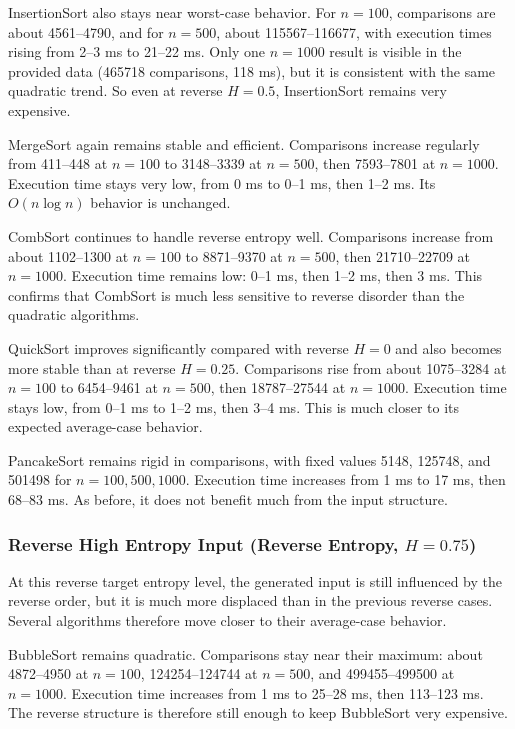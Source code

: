 \documentclass{article}
\begin{document}
InsertionSort also stays near worst-case behavior. For $n=100$, comparisons are about 4561--4790, and for $n=500$, about 115567--116677, with execution times rising from 2--3 ms to 21--22 ms. Only one $n=1000$ result is visible in the provided data (465718 comparisons, 118 ms), but it is consistent with the same quadratic trend. So even at reverse $H=0.5$, InsertionSort remains very expensive.

MergeSort again remains stable and efficient. Comparisons increase regularly from 411--448 at $n=100$ to 3148--3339 at $n=500$, then 7593--7801 at $n=1000$. Execution time stays very low, from 0 ms to 0--1 ms, then 1--2 ms. Its $O(n \log n)$ behavior is unchanged.

CombSort continues to handle reverse entropy well. Comparisons increase from about 1102--1300 at $n=100$ to 8871--9370 at $n=500$, then 21710--22709 at $n=1000$. Execution time remains low: 0--1 ms, then 1--2 ms, then 3 ms. This confirms that CombSort is much less sensitive to reverse disorder than the quadratic algorithms.

QuickSort improves significantly compared with reverse $H=0$ and also becomes more stable than at reverse $H=0.25$. Comparisons rise from about 1075--3284 at $n=100$ to 6454--9461 at $n=500$, then 18787--27544 at $n=1000$. Execution time stays low, from 0--1 ms to 1--2 ms, then 3--4 ms. This is much closer to its expected average-case behavior.

PancakeSort remains rigid in comparisons, with fixed values 5148, 125748, and 501498 for $n=100,500,1000$. Execution time increases from 1 ms to 17 ms, then 68--83 ms. As before, it does not benefit much from the input structure.


\subsubsection{Reverse High Entropy Input (Reverse Entropy, $H = 0.75$)}

At this reverse target entropy level, the generated input is still influenced by the reverse order, but it is much more displaced than in the previous reverse cases. Several algorithms therefore move closer to their average-case behavior.

BubbleSort remains quadratic. Comparisons stay near their maximum: about 4872--4950 at $n=100$, 124254--124744 at $n=500$, and 499455--499500 at $n=1000$. Execution time increases from 1 ms to 25--28 ms, then 113--123 ms. The reverse structure is therefore still enough to keep BubbleSort very expensive.
\end{document}
